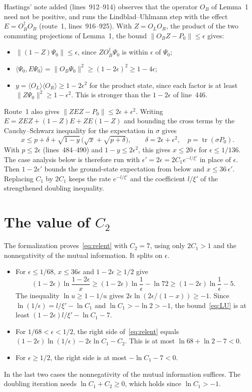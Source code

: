 \documentclass{article}
\begin{document}
Hastings' note added (lines~912--914) observes that the operator $O_B$ of
Lemma~1 need not be positive, and runs the Lindblad--Uhlmann step with the
effect $E=O_B^\dagger O_B$ (route~1, lines~916--925). With $Z=O_LO_R$, the product of the two
commuting projections of Lemma~1, the bound
$\lVert O_BZ-P_0\rVert\le\epsilon$ gives:
\begin{itemize}
  \item $\lVert(1-Z)\Psi_0\rVert\le\epsilon$, since $ZO_B^\dagger\Psi_0$ is
    within $\epsilon$ of $\Psi_0$;
  \item $\langle\Psi_0,E\Psi_0\rangle=\lVert O_B\Psi_0\rVert^2\ge(1-2\epsilon)^2
    \ge1-4\epsilon$;
  \item $y=\langle O_L\rangle\langle O_R\rangle\ge1-2\epsilon^2$ for the product
    state, since each factor is at least
    $\lVert Z\Psi_0\rVert^2\ge1-\epsilon^2$. This is stronger than the
    $1-2\epsilon$ of line~446.
\end{itemize}
Route~1 also gives $\lVert ZEZ-P_0\rVert\le2\epsilon+\epsilon^2$. Writing
$E=ZEZ+(1-Z)E+ZE(1-Z)$ and bounding the cross terms by the Cauchy--Schwarz
inequality for the expectation in $\sigma$ gives
\[
  x\le p+\delta+\sqrt{1-y}\,\bigl(\sqrt x+\sqrt{p+\delta}\bigr),
  \qquad\delta=2\epsilon+\epsilon^2,\quad p=\operatorname{tr}(\sigma P_0).
\]
With $p\le2\epsilon$ (lines~484--490) and $1-y\le2\epsilon^2$, this gives
$x\le20\,\epsilon$ for $\epsilon\le1/136$. The case analysis below is
therefore run with $\epsilon'=2\epsilon=2C_1e^{-l/\xi'}$ in place of
$\epsilon$. Then $1-2\epsilon'$ bounds the ground-state expectation from below
and $x\le36\,\epsilon'$. Replacing $C_1$ by $2C_1$ keeps the rate
$e^{-l/\xi'}$ and the coefficient $l/\xi'$ of the strengthened doubling
inequality.

\section{The value of $C_2$}

The formalization proves~\eqref{eq:relent} with $C_2=7$, using only $2C_1>1$
and the nonnegativity of the mutual information. It splits on $\epsilon$.
\begin{itemize}
  \item For $\epsilon\le1/68$, $x\le36\epsilon$ and $1-2\epsilon\ge1/2$ give
    \[
      (1-2\epsilon)\ln\frac{1-2\epsilon}{x}
      \ge(1-2\epsilon)\ln\frac1\epsilon-\ln 72
      \ge(1-2\epsilon)\ln\frac1\epsilon-5 .
    \]
    The inequality $\ln u\ge1-1/u$ gives
    $2\epsilon\ln(2\epsilon/(1-x))\ge-1$. Since
    $\ln(1/\epsilon)=l/\xi'-\ln C_1$ and $\ln C_1>-\ln2>-1$,
    the bound~\eqref{eq:LU} is at least
    $(1-2\epsilon)l/\xi'-\ln C_1-7$.
  \item For $1/68<\epsilon<1/2$, the right side of~\eqref{eq:relent} equals
    $(1-2\epsilon)\ln(1/\epsilon)-2\epsilon\ln C_1-C_2$. This is at most
    $\ln68+\ln2-7<0$.
  \item For $\epsilon\ge1/2$, the right side is at most $-\ln C_1-7<0$.
\end{itemize}
In the last two cases the nonnegativity of the mutual information suffices.
The doubling iteration needs $\ln C_1+C_2\ge0$, which holds since
$\ln C_1>-1$.
\end{document}
